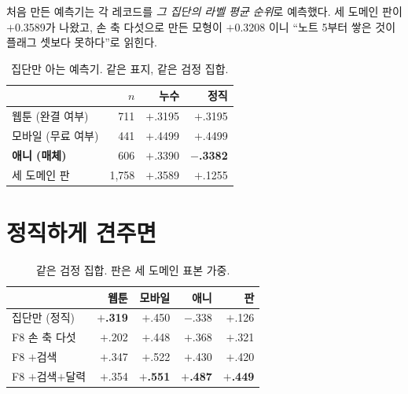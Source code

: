 \documentclass[10pt]{article}
\begin{document}
처음 만든 예측기는 각 레코드를 \emph{그 집단의 라벨 평균 순위}로 예측했다.
세 도메인 판이 $+$0.3589가 나왔고, 손 축 다섯으로 만든 모형이 $+$0.3208
이니 ``노트 5부터 쌓은 것이 플래그 셋보다 못하다''로 읽힌다.


\begin{table}[t]
\centering\tsize
\caption{집단만 아는 예측기. 같은 표지, 같은 검정 집합.}
\begin{tabular}{lrrr}
\toprule
& $n$ & 누수 & 정직 \\
\midrule
웹툰 (완결 여부) & 711 & $+$.3195 & $+$.3195 \\
모바일 (무료 여부) & 441 & $+$.4499 & $+$.4499 \\
\textbf{애니 (매체)} & 606 & $+$.3390 & \textbf{$-$.3382} \\
\midrule
세 도메인 판 & 1{,}758 & $+$.3589 & $+$.1255 \\
\bottomrule
\end{tabular}
\end{table}


\section{정직하게 견주면}

\begin{table}[t]
\centering\tsize
\caption{같은 검정 집합. 판은 세 도메인 표본 가중.}
\begin{tabular}{lrrrr}
\toprule
& 웹툰 & 모바일 & 애니 & 판 \\
\midrule
집단만 (정직) & \textbf{$+$.319} & $+$.450 & $-$.338 & $+$.126 \\
F8 손 축 다섯 & $+$.202 & $+$.448 & $+$.368 & $+$.321 \\
F8 $+$검색 & $+$.347 & $+$.522 & $+$.430 & $+$.420 \\
F8 $+$검색$+$달력 & $+$.354 & \textbf{$+$.551} & \textbf{$+$.487} & \textbf{$+$.449} \\
\bottomrule
\end{tabular}
\end{table}
\end{document}
